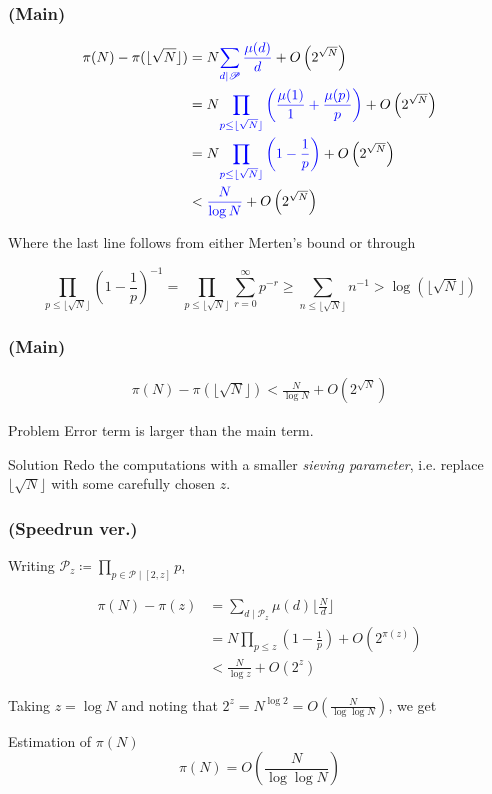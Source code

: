 \begin{frame}\frametitle{\insertsubsection (Main)}
\begin{align*}
  \pi(N) - \pi(\lfloor\sqrt{N}\rfloor)
  &= N {\color{blue} \sum_{d \mid \mathscr{P}} \frac{\mu(d)}{d}} + O\left(2^{\sqrt{N}}\right) \\
  &= N {\color{blue} \prod_{p \leq \lfloor\sqrt{N}\rfloor} \left(\frac{\mu(1)}{1} + \frac{\mu(p)}{p}\right)} + O\left(2^{\sqrt{N}}\right) \\
  &= N {\color{blue} \prod_{p \leq \lfloor\sqrt{N}\rfloor} \left(1 - \frac{1}{p}\right)} + O\left(2^{\sqrt{N}}\right) \\
  &< {\color{blue} \frac{N}{\log N}} + O\left(2^{\sqrt{N}}\right)
\end{align*}

Where the last line follows from either Merten's bound or through

\[
  \prod_{p \leq \lfloor\sqrt{N}\rfloor} \left(1 - \frac{1}{p}\right)^{-1} = \prod_{p \leq \lfloor\sqrt{N}\rfloor} \sum_{r = 0}^{\infty} p^{-r} \geq \sum_{n \leq \lfloor\sqrt{N}\rfloor} n^{-1} > \log\left(\lfloor\sqrt{N}\rfloor\right)
\]
\end{frame}

\begin{frame}\frametitle{\insertsubsection (Main)}

\begin{align*}
  \pi(N) - \pi(\lfloor\sqrt{N}\rfloor)
  < \frac{N}{\log N} + O\left(2^{\sqrt{N}}\right)
\end{align*}

\begin{alertblock}{Problem}
  Error term is larger than the main term.
\end{alertblock}

\begin{exampleblock}{Solution}
  Redo the computations with a smaller \textit{sieving parameter}, i.e. replace \(\lfloor\sqrt{N}\rfloor\) with some carefully chosen \(z\).
\end{exampleblock}
\end{frame}

\begin{frame}\frametitle{\insertsubsection (Speedrun ver.)}

  Writing \(\mathscr{P}_z \coloneqq \prod_{p \in \mathcal{P} \mid [2, z]} p\),

\begin{align*}
  \pi(N) - \pi(z)
  &= \sum_{d \mid \mathscr{P}_z} \mu(d) \lfloor\frac{N}{d}\rfloor \\
  &= N\prod_{p \leq z} \left(1 - \frac{1}{p}\right) + O(2^{\pi(z)}) \\
  &< \frac{N}{\log z} + O(2^z)
\end{align*}

Taking \(z = \log N\) and noting that \(2^z = N^{\log 2} = O\left(\frac{N}{\log \log N}\right)\), we get

\begin{exampleblock}{Estimation of \(\pi(N)\)}
\[
  \pi(N) = O\left(\frac{N}{\log \log N}\right)
\]
\end{exampleblock}

\end{frame}
